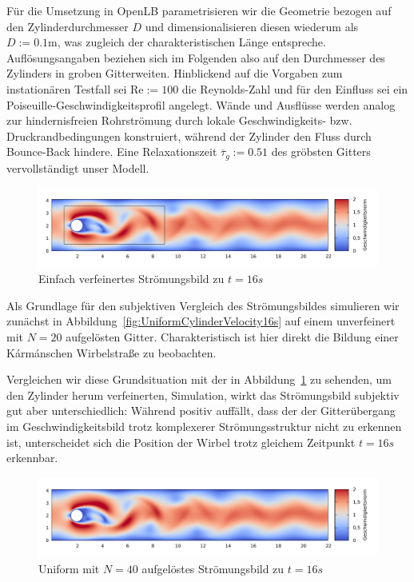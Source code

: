 Für die Umsetzung in OpenLB parametrisieren wir die Geometrie bezogen auf den Zylinderdurchmesser \(D\) und dimensionalisieren diesen wiederum als \(D := \num{0.1}\si{\meter}\), was zugleich der charakteristischen Länge entspreche. Auflösungsangaben beziehen sich im Folgenden also auf den Durchmesser des Zylinders in groben Gitterweiten. Hinblickend auf die Vorgaben zum instationären Testfall \cite[Kapitel~2.2b]{SchaeferTurek96} sei \(\text{Re}:=100\) die Reynolds-Zahl und für den Einfluss sei ein Poiseuille-Geschwindigkeitsprofil angelegt. Wände und Ausflüsse werden analog zur hindernisfreien Rohrströmung durch lokale Geschwindigkeits- bzw. Druckrandbedingungen konstruiert, während der Zylinder den Fluss durch Bounce-Back hindere. Eine Relaxationszeit \(\overline\tau_g := \num{0.51}\) des gröbsten Gitters vervollständigt unser Modell.

\begin{figure}[h]
\begin{adjustbox}{center}
\includegraphics[width=1.2\textwidth]{img/static/cylinder2d_single_refinement_n20_re100_16s.pdf}
\end{adjustbox}
\caption{Einfach verfeinertes Strömungsbild zu \(t=16s\)}
\label{fig:SingleLevelRefinementCylinderVelocity16s}
\end{figure}

Als Grundlage für den subjektiven Vergleich des Strömungsbildes simulieren wir zunächst in Abbildung~\ref{fig:UniformCylinderVelocity16s} auf einem unverfeinert mit \(N=20\) aufgelösten Gitter. Charakteristisch ist hier direkt die Bildung einer Kármánschen Wirbelstraße zu beobachten.

\noindent
Vergleichen wir diese Grundsituation mit der in Abbildung~\ref{fig:SingleLevelRefinementCylinderVelocity16s} zu sehenden, um den Zylinder herum verfeinerten, Simulation, wirkt das Strömungsbild subjektiv gut aber unterschiedlich: Während positiv auffällt, dass der der Gitterübergang im Geschwindigkeitsbild trotz komplexerer Strömungsstruktur nicht zu erkennen ist, unterscheidet sich die Position der Wirbel trotz gleichem Zeitpunkt \(t=16s\) erkennbar.

\begin{figure}[H]
\begin{adjustbox}{center}
\includegraphics[width=1.2\textwidth]{img/static/cylinder2d_unrefined_n40_re100_16s.pdf}
\end{adjustbox}
\caption{Uniform mit \(N=40\) aufgelöstes Strömungsbild zu \(t=16s\)}
\label{fig:UniformCylinderVelocityN4016s}
\end{figure}


